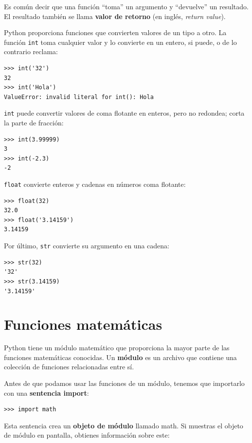 \documentclass[10pt]{book}
\begin{document}
Es común decir que una función ``toma'' un argumento y ``devuelve''
un resultado.  El resultado también se llama {\bf valor de retorno} (en inglés, {\em return value}).

Python proporciona funciones que convierten valores
de un tipo a otro.  La función {\tt int} toma cualquier valor y
lo convierte en un entero, si puede, o de lo contrario reclama:

\begin{verbatim}
>>> int('32')
32
>>> int('Hola')
ValueError: invalid literal for int(): Hola
\end{verbatim}
%
{\tt int} puede convertir valores de coma flotante en enteros, pero
no redondea; corta la parte de fracción:

\begin{verbatim}
>>> int(3.99999)
3
>>> int(-2.3)
-2
\end{verbatim}
%
{\tt float} convierte enteros y cadenas en números coma
flotante:

\begin{verbatim}
>>> float(32)
32.0
>>> float('3.14159')
3.14159
\end{verbatim}
%
Por último, {\tt str} convierte su argumento en una cadena:

\begin{verbatim}
>>> str(32)
'32'
>>> str(3.14159)
'3.14159'
\end{verbatim}
%

\section{Funciones matemáticas}

Python tiene un módulo matemático que proporciona la mayor parte de las
funciones matemáticas conocidas.  Un {\bf módulo} es un archivo que contiene una
colección de funciones relacionadas entre sí.

Antes de que podamos usar las funciones de un módulo, tenemos que importarlo con
una {\bf sentencia import}:

\begin{verbatim}
>>> import math
\end{verbatim}
%
Esta sentencia crea un {\bf objeto de módulo} llamado math.  Si
muestras el objeto de módulo en pantalla, obtienes información sobre este:
\end{document}
